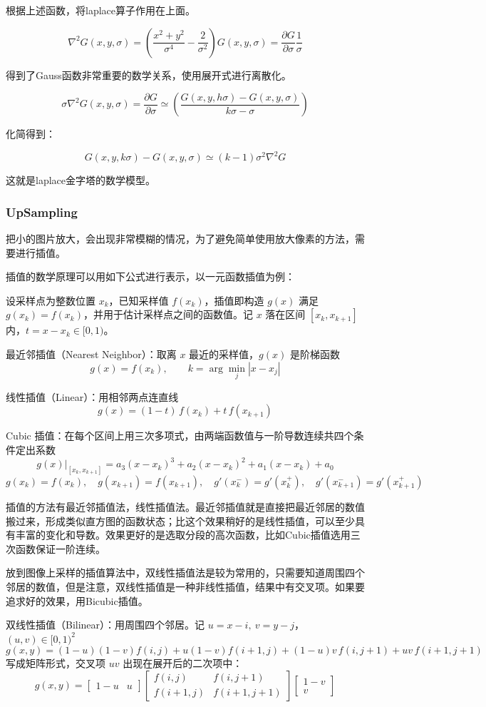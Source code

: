 根据上述函数，将laplace算子作用在上面。

\[
\nabla^2 G(x , y ,\sigma) = (\frac{x ^ 2 + y ^ 2}{\sigma^4} - \frac{2}{\sigma^2})G(x, y, \sigma) = \frac{\partial G}{\partial \sigma} \frac{1}{\sigma}
\]

得到了Gauss函数非常重要的数学关系，使用展开式进行离散化。

\[
\sigma \nabla^2 G(x, y, \sigma) = \frac{\partial G}{\partial \sigma} \simeq (\frac{G(x,y,h\sigma) - G(x,y,\sigma)}{k\sigma - \sigma})
\]

化简得到：

\[
G(x, y ,k\sigma) - G(x, y, \sigma) \simeq (k-1)\sigma^2 \nabla^2 G
\]

这就是laplace金字塔的数学模型。

\subsubsection{UpSampling}

把小的图片放大，会出现非常模糊的情况，为了避免简单使用放大像素的方法，需要进行插值。

插值的数学原理可以用如下公式进行表示，以一元函数插值为例：

设采样点为整数位置 $x_k$，已知采样值 $f(x_k)$，插值即构造 $g(x)$ 满足 $g(x_k)=f(x_k)$，并用于估计采样点之间的函数值。记 $x$ 落在区间 $[x_k,x_{k+1}]$ 内，$t=x-x_k\in[0,1)$。

最近邻插值（Nearest Neighbor）：取离 $x$ 最近的采样值，$g(x)$ 是阶梯函数
\[
g(x)=f(x_k),\qquad k=\arg\min_{j}|x-x_j|
\]

线性插值（Linear）：用相邻两点连直线
\[
g(x)=(1-t)\,f(x_k)+t\,f(x_{k+1})
\]

Cubic 插值：在每个区间上用三次多项式，由两端函数值与一阶导数连续共四个条件定出系数
\[
g(x)\big|_{[x_k,x_{k+1}]}=a_3(x-x_k)^3+a_2(x-x_k)^2+a_1(x-x_k)+a_0
\]
\[
g(x_k)=f(x_k),\quad g(x_{k+1})=f(x_{k+1}),\quad g'(x_k^-)=g'(x_k^+),\quad g'(x_{k+1}^-)=g'(x_{k+1}^+)
\]

插值的方法有最近邻插值法，线性插值法。最近邻插值就是直接把最近邻居的数值搬过来，形成类似直方图的函数状态；比这个效果稍好的是线性插值，可以至少具有丰富的变化和导数。效果更好的是选取分段的高次函数，比如Cubic插值选用三次函数保证一阶连续。

放到图像上采样的插值算法中，双线性插值法是较为常用的，只需要知道周围四个邻居的数值，但是注意，双线性插值是一种非线性插值，结果中有交叉项。如果要追求好的效果，用Bicubic插值。

双线性插值（Bilinear）：用周围四个邻居。记 $u=x-i,\ v=y-j$，$(u,v)\in[0,1)^2$
\[
g(x,y)=(1-u)(1-v)f(i,j)+u(1-v)f(i+1,j)+(1-u)v\,f(i,j+1)+uv\,f(i+1,j+1)
\]
写成矩阵形式，交叉项 $uv$ 出现在展开后的二次项中：
\[
g(x,y)=
\begin{bmatrix}1-u & u\end{bmatrix}
\begin{bmatrix}f(i,j) & f(i,j+1)\\ f(i+1,j) & f(i+1,j+1)\end{bmatrix}
\begin{bmatrix}1-v\\ v\end{bmatrix}
\]

